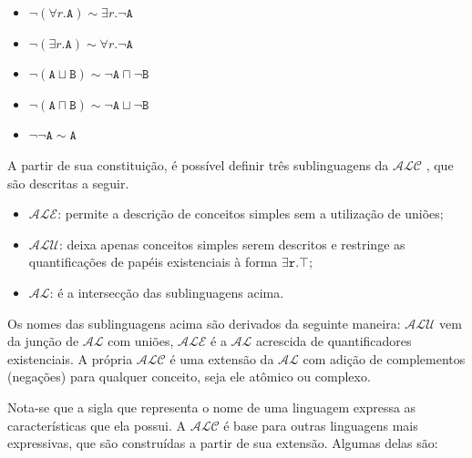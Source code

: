 \begin{itemize}
	\item $ \neg(\forall r.\texttt{A}) \sim \exists r.\neg \texttt{A}$ 
	\item $ \neg(\exists r.\texttt{A}) \sim \forall r.\neg \texttt{A}$ 
	\item $ \neg(\texttt{A} \sqcup \texttt{B}) \sim \neg \texttt{A} \sqcap \neg \texttt{B}$ 
	\item $ \neg(\texttt{A} \sqcap \texttt{B}) \sim \neg \texttt{A} \sqcup \neg \texttt{B}$ 
	\item $ \neg \neg \texttt{A} \sim \texttt{A} $
\end{itemize}

A partir de sua constituição, é possível definir três sublinguagens da $\mathcal{ALC}$ \cite{logicaSchmidt}, que são descritas a seguir.

\begin{itemize}
	\item $\mathcal{ALE}$: permite a descrição de conceitos simples sem a utilização de uniões; 
	\item $\mathcal{ALU}$: deixa apenas conceitos simples serem descritos e restringe as quantificações de papéis existenciais à forma $ \exists\texttt{r}.\top $;
	\item $\mathcal{AL}$: é a intersecção das sublinguagens acima.
\end{itemize}

Os nomes das sublinguagens acima são derivados da seguinte maneira: $ \mathcal{ALU} $ vem da junção de $ \mathcal{AL} $ com uniões, $ \mathcal{ALE} $ é a $ \mathcal{AL} $ acrescida de quantificadores existenciais. A própria $ \mathcal{ALC} $ é uma extensão da $ \mathcal{AL} $ com adição de complementos (negações) para qualquer conceito, seja ele atômico ou complexo. 

Nota-se que a sigla que representa o nome de uma linguagem expressa as características que ela possui.
A $ \mathcal{ALC} $ é base para outras linguagens mais expressivas, que são construídas a partir de sua extensão. Algumas delas são:

